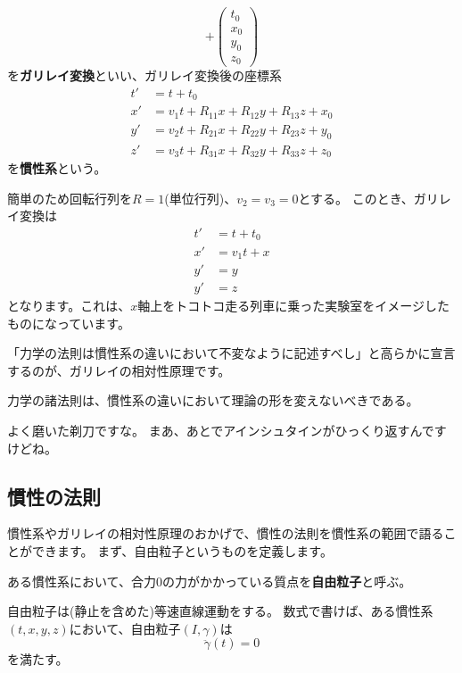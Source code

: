 \begin{definition}[ガリレイ変換と慣性系]
\[    +
    \begin{pmatrix}
      t_0\\x_0\\y_0\\z_0
    \end{pmatrix}
  \]
  を\textbf{ガリレイ変換}といい、ガリレイ変換後の座標系
  \begin{align*}
    t'&=t+t_0\\
    x'&=v_1t+R_{11}x+R_{12}y+R_{13}z+x_0\\
    y'&=v_2t+R_{21}x+R_{22}y+R_{23}z+y_0\\
    z'&=v_3t+R_{31}x+R_{32}y+R_{33}z+z_0
  \end{align*}
  を\textbf{慣性系}という。
\end{definition}

\begin{example}
  簡単のため回転行列を$R=1$(単位行列)、$v_2=v_3=0$とする。
  このとき、ガリレイ変換は
  \begin{align*}
    t'&=t+t_0\\
    x'&=v_1t+x\\
    y'&=y\\
    y'&=z
  \end{align*}
  となります。これは、$x$軸上をトコトコ走る列車に乗った実験室をイメージしたものになっています。
\end{example}

「力学の法則は慣性系の違いにおいて不変なように記述すべし」と高らかに宣言するのが、ガリレイの相対性原理です。
\begin{definition}[ガリレイの相対性原理]
  力学の諸法則は、慣性系の違いにおいて理論の形を変えないべきである。
\end{definition}
よく磨いた剃刀ですな。
まあ、あとでアインシュタインがひっくり返すんですけどね。

\subsection{慣性の法則}

慣性系やガリレイの相対性原理のおかげで、慣性の法則を慣性系の範囲で語ることができます。
まず、自由粒子というものを定義します。
\begin{definition}
  ある慣性系において、合力0の力がかかっている質点を\textbf{自由粒子}と呼ぶ。
\end{definition}
\begin{definition}[慣性の法則]
  自由粒子は(静止を含めた)等速直線運動をする。
  数式で書けば、ある慣性系$(t,x,y,z)$において、自由粒子$(I,\gamma)$は
  \[
    \ddot\gamma(t)=0
  \]
  を満たす。
\end{definition}

